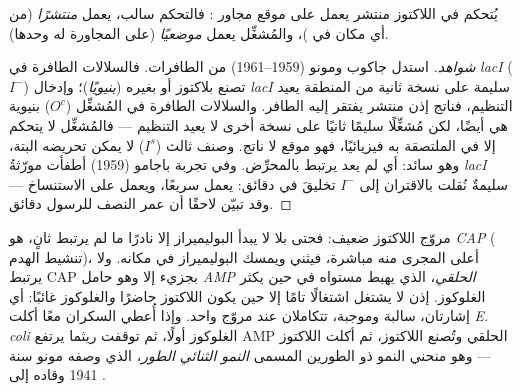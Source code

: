 \begin{proposition}\label{prop:b1:expression-control:jacobmonod}
يُتحكم في  اللاكتوز  منتشر يعمل على موقع مجاور
: فالتحكم سالب،  يعمل \emph{منتشرًا} (من أي مكان في
)، والمُشغِّل يعمل \emph{موضعيًا} (على  المجاورة له
وحدها).
\end{proposition}
\begin{proof}[شواهد]
استدل جاكوب ومونو (1959--1961) من الطافرات. فالسلالات الطافرة في
\emph{lacI} ($I^-$) تصنع  بلاكتوز أو بغيره
(\emph{بنيويًا})؛ وإدخال  \emph{lacI} سليمة على نسخة ثانية من
المنطقة يعيد التنظيم، فناتج  إذن  منتشر يفتقر إليه
الطافر. والسلالات الطافرة في المُشغِّل ($O^c$) بنيوية هي أيضًا، لكن
مُشغِّلًا سليمًا ثانيًا على نسخة أخرى لا يعيد التنظيم --- فالمُشغِّل
لا يتحكم إلا في  الملتصقة به فيزيائيًا، فهو موقع لا ناتج.
وصنف ثالث ($I^s$) لا يمكن تحريضه البتة، وهو سائد: أي  لم يعد
يرتبط بالمحرِّض. وفي تجربة باجامو (1959) أطفأت مورّثةُ \emph{lacI}
سليمةٌ نُقلت بالاقتران إلى  $I^-$ تخليقَ  في دقائق:
 يعمل سريعًا، ويعمل على الاستنساخ --- وقد تبيّن لاحقًا أن عمر
النصف للرسول دقائق.
\end{proof}

\begin{definition}\label{def:b1:expression-control:cap}
مروّج اللاكتوز ضعيف: فحتى بلا  لا يبدأ البوليميراز إلا نادرًا ما
لم يرتبط  ثانٍ، هو \emph{CAP} ( تنشيط الهدم)، أعلى
المجرى منه مباشرة، فيثني  ويمسك البوليميراز في مكانه. ولا يرتبط
CAP بجزيء  إلا وهو حامل \emph{AMP الحلقي}، الذي يهبط مستواه في
 حين يكثر الغلوكوز.  إذن لا يشتغل اشتغالًا تامًا إلا
حين يكون اللاكتوز حاضرًا \emph{و}الغلوكوز غائبًا: أي إشارتان،
سالبة وموجبة، تتكاملان عند مروّج واحد. وإذا أُعطي السكران معًا أكلت
\emph{E. coli} الغلوكوز أولًا، ثم توقفت ريثما يرتفع AMP الحلقي
وتُصنع  اللاكتوز، ثم أكلت اللاكتوز --- وهو منحني النمو ذو
الطورين المسمى \emph{النمو الثنائي الطور}، الذي وصفه مونو سنة 1941
وقاده إلى .
\end{definition}

